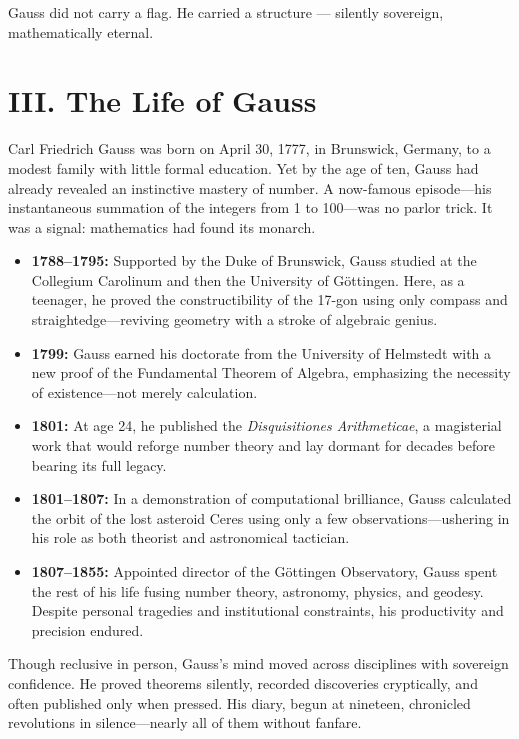 \documentclass[9pt]{article}
\begin{document}
Gauss did not carry a flag. He carried a structure — silently sovereign, mathematically eternal.


\newpage

\section*{III. The Life of Gauss}

Carl Friedrich Gauss was born on April 30, 1777, in Brunswick, Germany, to a modest family with little formal education. Yet by the age of ten, Gauss had already revealed an instinctive mastery of number. A now-famous episode—his instantaneous summation of the integers from 1 to 100—was no parlor trick. It was a signal: mathematics had found its monarch.

\begin{itemize}
  \item \textbf{1788–1795:} Supported by the Duke of Brunswick, Gauss studied at the Collegium Carolinum and then the University of Göttingen. Here, as a teenager, he proved the constructibility of the 17-gon using only compass and straightedge—reviving geometry with a stroke of algebraic genius.
  
  \item \textbf{1799:} Gauss earned his doctorate from the University of Helmstedt with a new proof of the Fundamental Theorem of Algebra, emphasizing the necessity of existence—not merely calculation.

  \item \textbf{1801:} At age 24, he published the \textit{Disquisitiones Arithmeticae}, a magisterial work that would reforge number theory and lay dormant for decades before bearing its full legacy.

  \item \textbf{1801–1807:} In a demonstration of computational brilliance, Gauss calculated the orbit of the lost asteroid Ceres using only a few observations—ushering in his role as both theorist and astronomical tactician.

  \item \textbf{1807–1855:} Appointed director of the Göttingen Observatory, Gauss spent the rest of his life fusing number theory, astronomy, physics, and geodesy. Despite personal tragedies and institutional constraints, his productivity and precision endured.
\end{itemize}

Though reclusive in person, Gauss's mind moved across disciplines with sovereign confidence. He proved theorems silently, recorded discoveries cryptically, and often published only when pressed. His diary, begun at nineteen, chronicled revolutions in silence—nearly all of them without fanfare.
\end{document}
